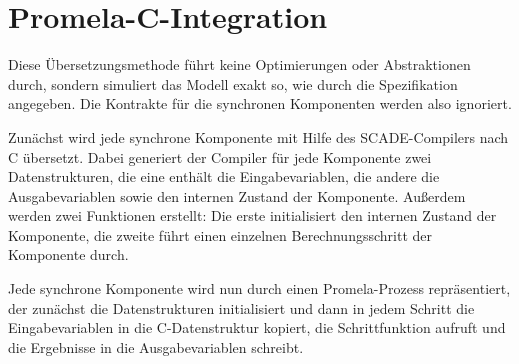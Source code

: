 \section{Promela-C-Integration}
Diese Übersetzungsmethode führt keine Optimierungen oder Abstraktionen durch, sondern simuliert das Modell exakt so, wie durch die Spezifikation angegeben.
Die Kontrakte für die synchronen Komponenten werden also ignoriert.

Zunächst wird jede synchrone Komponente mit Hilfe des SCADE-Compilers nach C übersetzt.
Dabei generiert der Compiler für jede Komponente zwei Datenstrukturen, die eine enthält die Eingabevariablen, die andere die Ausgabevariablen sowie den internen Zustand der Komponente.
Außerdem werden zwei Funktionen erstellt:
Die erste initialisiert den internen Zustand der Komponente, die zweite führt einen einzelnen Berechnungsschritt der Komponente durch.

Jede synchrone Komponente wird nun durch einen Promela-Prozess repräsentiert, der zunächst die Datenstrukturen initialisiert und dann in jedem Schritt die Eingabevariablen in die C-Datenstruktur kopiert, die Schrittfunktion aufruft und die Ergebnisse in die Ausgabevariablen schreibt.
